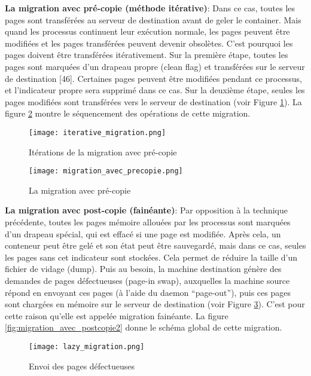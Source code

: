 \textbf{La migration avec pré-copie (méthode itérative)}: Dans ce cas, toutes les pages sont transférées au serveur de destination avant de geler le container. Mais quand les processus continuent leur exécution normale, les pages peuvent être modifiées et les pages transférées peuvent devenir obsolètes. C'est pourquoi les pages doivent être transférées itérativement. Sur la première étape, toutes les pages sont marquées d'un drapeau propre (clean flag) et transférées sur le serveur de destination [46]. Certaines pages peuvent être modifiées pendant ce processus, et l'indicateur propre sera supprimé dans ce cas. Sur la deuxième étape, seules les pages modifiées sont transférées vers le serveur de destination (voir Figure \ref{fig:migration_avec_precopie1}). La figure \ref{fig:migration_avec_precopie2} montre le séquencement des opérations de cette migration.\par
\begin{figure}[H]
\centering
\texttt{[image: iterative\_migration.png]}
\caption{Itérations de la migration avec pré-copie \cite{mirkin2008}}
\label{fig:migration_avec_precopie1}
\end{figure}
\begin{figure}[H]
\centering
\texttt{[image: migration\_avec\_precopie.png]}
\caption{La migration avec pré-copie \cite{puliafito2019}}
\label{fig:migration_avec_precopie2}
\end{figure}
\textbf{La migration avec post-copie (fainéante)}: Par opposition à la technique précédente, toutes les pages mémoire allouées par les processus sont marquées d'un drapeau spécial, qui est effacé si une page est modifiée. Après cela, un conteneur peut être gelé et son état peut être sauvegardé, mais dans ce cas, seules les pages sans cet indicateur sont stockées. Cela permet de réduire la taille d'un fichier de vidage (dump). Puis au besoin, la machine destination génère des demandes de pages défectueuses (page-in swap), auxquelles la machine source répond en envoyant ces pages (à l'aide du daemon “page-out”), puis ces pages sont chargées en mémoire sur le serveur de destination (voir Figure \ref{fig:migration_avec_postcopie1}). C'est pour cette raison qu'elle est appelée migration fainéante. La figure \ref{fig:migration_avec_postcopie2} donne le schéma global de cette migration.\par
\begin{figure}[H]
\centering
\texttt{[image: lazy\_migration.png]}
\caption{Envoi des pages défectueuses \cite{mirkin2008}}
\label{fig:migration_avec_postcopie1}
\end{figure}
